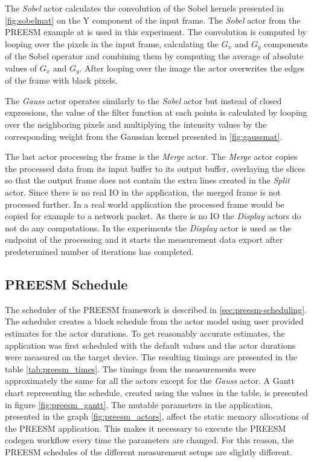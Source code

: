The \textit{Sobel} actor calculates the convolution of the Sobel kernels presented in \ref{fig:sobelmat} on the Y component of the input frame. The \textit{Sobel} actor from the PREESM example at \cite{preesmtut} is used in this experiment. The convolution is computed by looping over the pixels in the input frame, calculating the $G_{x}$ and $G_{y}$ components of the Sobel operator and combining them by computing the average of absolute values of $G_{x}$ and $G_{y}$. After looping over the image the actor overwrites the edges of the frame with black pixels.

The \textit{Gauss} actor operates similarly to the \textit{Sobel} actor but instead of closed expressions, the value of the filter function at each points is calculated by looping over the neighboring pixels and multiplying the intensity values by the corresponding weight from the Gaussian kernel presented in \ref{fig:gaussmat}.

The last actor processing the frame is the \textit{Merge} actor. The \textit{Merge} actor copies the processed data from its input buffer to its output buffer, overlaying the slices so that the output frame does not contain the extra lines created in the \textit{Split} actor. Since there is no real IO in the application, the merged frame is not processed further. In a real world application the processed frame would be copied for example to a network packet. As there is no IO the \textit{Display} actors do not do any computations. In the experiments the \textit{Display} actor is used as the endpoint of the processing and it starts the measurement data export after predetermined number of iterations has completed.

\subsection{PREESM Schedule}
\label{subsec:preesmsched}
The scheduler of the PREESM framework is described in \ref{sec:preesm-scheduling}. The scheduler creates a block schedule from the actor model using user provided estimates for the actor durations. To get reasonably accurate estimates, the application was first scheduled with the default values and the actor durations were measured on the target device. The resulting timings are presented in the table \ref{tab:preesm_times}. The timings from the measurements were approximately the same for all the actors except for the \textit{Gauss} actor. A Gantt chart representing the schedule, created using the values in the table, is presented in figure \ref{fig:preesm_gantt}. The mutable parameters in the application, presented in the graph \ref{fig:preesm_actors}, affect the static memory allocations of the PREESM application. This makes it necessary to execute the PREESM codegen workflow every time the parameters are changed. For this reason, the PREESM schedules of the different measurement setups are slightly different.

